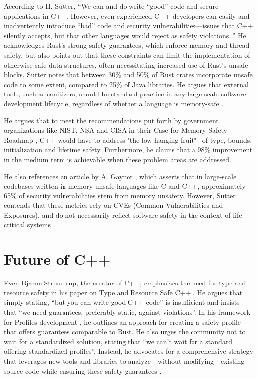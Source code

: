 According to H. Sutter, \enquote{We can and do write “good” code and secure applications in C++. However, even experienced C++ developers can easily and inadvertently introduce “bad” code and security vulnerabilities—issues that C++ silently accepts, but that other languages would reject as safety violations \cite[]{sutterSafetyContext2024}.} He acknowledges Rust’s strong safety guarantees, which enforce memory and thread safety, but also points out that these constraints can limit the implementation of otherwise safe data structures, often necessitating increased use of Rust’s unsafe blocks. Sutter notes that between 30\% and 50\% of Rust crates incorporate unsafe code to some extent, compared to 25\% of Java libraries. He argues that external tools, such as sanitizers, should be standard practice in any large-scale software development lifecycle, regardless of whether a language is memory-safe \cite[]{sutterSafetyContext2024}.

He argues that to meet the recommendations put forth by government organizations like NIST, NSA and CISA in their Case for Memory Safety Roadmap \cite[]{CaseMemorySafe2023}, C++ would have to address "the low-hanging fruit"~\cite[]{stroustrupFrameworkProfilesDevelopment} of type, bounds, initialization and lifetime safety. Furthermore, he claims that a 98\% improvement in the medium term is achievable when these problem areas are addressed.

He also references an article by A. Gaynor \cite[]{WhatScienceCan}, which asserts that in large-scale codebases written in memory-unsafe languages like C and C++, approximately 65\% of security vulnerabilities stem from memory unsafety. However, Sutter contends that these metrics rely on CVEs (Common Vulnerabilities and Exposures), and do not necessarily reflect software safety in the context of life-critical systems \cite[]{sutterSafetyContext2024}.

\section{Future of C++}

Even Bjarne Stroustrup, the creator of C++, emphasizes the need for type and resource safety in his paper on Type and Resource Safe C++ \cite[]{stroustrupDesignAlternativesTypeandResource}. He argues that simply stating, \enquote{but you can write good C++ code} is insufficient and insists that \enquote{we need guarantees, preferably static, against violations}. In his framework for Profiles development \cite[]{stroustrupFrameworkProfilesDevelopment}, he outlines an approach for creating a safety profile that offers guarantees comparable to Rust. He also urges the community not to wait for a standardized solution, stating that \enquote{we can’t wait for a standard offering standardized profiles}. Instead, he advocates for a comprehensive strategy that leverages new tools and libraries to analyze—without modifying—existing source code while ensuring these safety guarantees \cite[]{stroustrupFrameworkProfilesDevelopment}.

